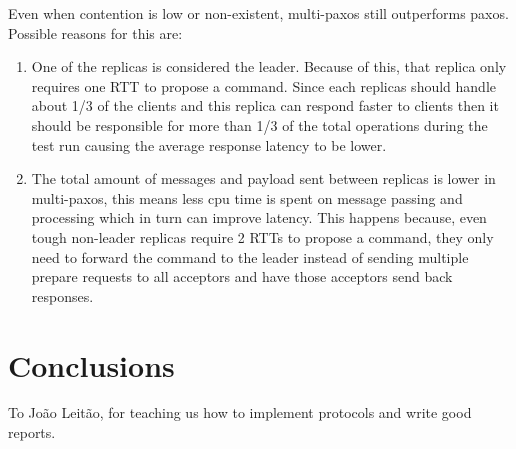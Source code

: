 \documentclass[sigconf]{acmart}
\begin{document}
Even when contention is low or non-existent, multi-paxos still outperforms paxos.
Possible reasons for this are:
\begin{enumerate}
    \item One of the replicas is considered the leader.
        Because of this, that replica only requires one RTT to propose a command.
        Since each replicas should handle about 1/3 of the clients and this replica can respond faster to clients
        then it should be responsible for more than 1/3 of the total operations during the test run causing the average response latency to be lower.
    \item The total amount of messages and payload sent between replicas is lower in multi-paxos, this means less cpu time is spent on message passing and processing which in turn can improve latency.
        This happens because, even tough non-leader replicas require 2 RTTs to propose a command, they only need to forward the command to the leader instead of sending multiple prepare requests to all acceptors and have those acceptors send back responses.
\end{enumerate}

\section{Conclusions}

\begin{acks}
    To João Leitão, for teaching us how to implement protocols and write good reports.
\end{acks}



\end{document}
